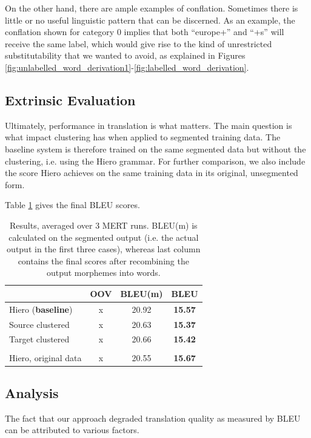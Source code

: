 On the other hand, there are ample examples of conflation. Sometimes there is little or no useful linguistic pattern that can be discerned.
As an example, the conflation shown for category 0 implies that both ``europe+'' and ``+s'' will receive the same label, which would give rise to the kind of unrestricted substitutability that we wanted to avoid, as explained in Figures \ref{fig:unlabelled_word_derivation1}-\ref{fig:labelled_word_derivation}.

\subsection{Extrinsic Evaluation}
Ultimately, performance in translation is what matters.
The main question is what impact clustering has when applied to segmented training data.
The baseline system is therefore trained on the same segmented data but without the clustering, i.e. using the Hiero grammar.
For further comparison, we also include the score Hiero achieves on the same training data in its original, unsegmented form.

Table \ref{tbl:m_bleu} gives the final BLEU scores.

\begin{table}[htb]
  \centering
  \begin{tabular}{|l|c|c|c|} \hline
     & \textbf{OOV} & \textbf{BLEU}(m) & \textbf{BLEU} \\ \hline 
    Hiero (\textbf{baseline}) & x & 20.92  & \textbf{15.57} \\ \hline
    Source clustered & x & 20.63 & \textbf{15.37} \\ \hline
    Target clustered & x & 20.66 & \textbf{15.42} \\ \hline
    \multicolumn{3}{c}{ } \\ \hline
    Hiero, original data & x & 20.55 & \textbf{15.67} \\ \hline
  \end{tabular}
  \caption{Results, averaged over 3 MERT runs. BLEU(m) is calculated on the segmented output (i.e. the actual output in the first three cases), whereas last column contains the final scores after recombining the output morphemes into words.}
  \label{tbl:m_bleu}
\end{table}

\subsection{Analysis} \label{sec:m_analysis}
The fact that our approach degraded translation quality as measured by BLEU can be attributed to various factors.

